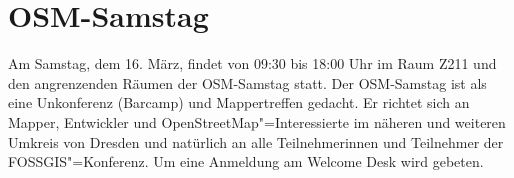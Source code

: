 \newpage
\pagestyle{cropmarksstyle}
\section*{OSM-Samstag}
\label{osm-samstag}
Am Samstag, dem 16. März, findet von 09:30 bis 18:00 Uhr im Raum Z211 und den angrenzenden Räumen der OSM-Samstag statt.
Der OSM-Samstag ist als eine Unkonferenz (Barcamp) und Mappertreffen gedacht.
Er richtet sich an Mapper, Entwickler und OpenStreetMap"=Interessierte im näheren und
weiteren Umkreis von Dresden und natürlich an alle Teilnehmerinnen und Teilnehmer der FOSSGIS"=Konferenz. Um eine Anmeldung am Welcome Desk wird gebeten.

